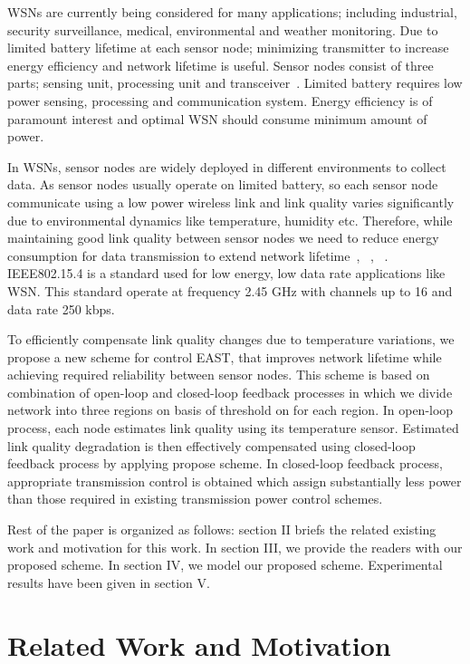 \documentclass[12pt, conference, compsocconf, onecolumn, draftcls]{IEEEtran}
\begin{document}
WSNs are currently being considered for many applications; including industrial, security surveillance, medical, environmental and weather monitoring. Due to limited battery lifetime at each sensor node; minimizing transmitter  to increase energy efficiency and network lifetime is useful. Sensor nodes consist of three parts; sensing unit, processing unit and transceiver~\cite{1}. Limited battery requires low power sensing, processing and communication system. Energy efficiency is of paramount interest and optimal WSN  should consume minimum amount of power.

In WSNs, sensor nodes are widely deployed in different environments to collect data. As sensor nodes usually operate on limited battery, so each sensor node communicate using a low power wireless link and link quality varies significantly due to environmental dynamics like temperature, humidity etc. Therefore, while maintaining good link quality between sensor nodes we need to reduce energy consumption for data transmission to extend network lifetime~\cite{2}, ~\cite{3}, ~\cite{4}. IEEE802.15.4 is a standard used for low energy, low data rate applications like WSN. This standard operate at  frequency  2.45 GHz with  channels up to 16 and  data rate  250 kbps.

To efficiently compensate link quality changes due to temperature variations, we propose a new scheme for  control EAST, that improves network lifetime while achieving required reliability between sensor nodes. This scheme is based on combination of open-loop and closed-loop feedback processes in which we divide network into three regions on basis of threshold on  for each region. In open-loop process, each node estimates link quality using its temperature sensor. Estimated link quality degradation is then effectively compensated using closed-loop feedback process by applying propose scheme. In closed-loop feedback process, appropriate transmission  control is obtained  which assign substantially less power than those required in existing transmission power control schemes.

Rest of the paper is organized as follows: section II briefs the related existing work and motivation for this work. In section III, we provide the readers with our proposed scheme. In section IV, we model our proposed scheme. Experimental results have been given in section V.

\section{Related Work and Motivation}
\end{document}
